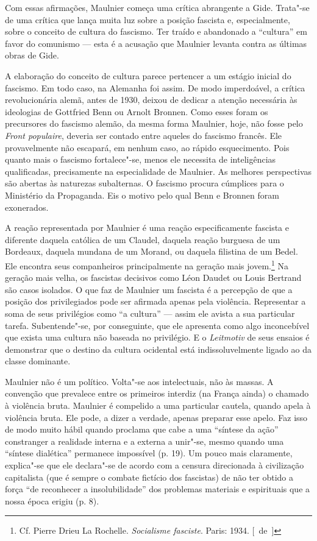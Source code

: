 Com essas afirmações, Maulnier começa uma crítica abrangente a Gide. Trata"-se de
uma crítica que lança muita luz sobre a posição fascista e,
especialmente, sobre o conceito de cultura do fascismo. Ter traído e
abandonado a ``cultura'' em favor do comunismo --- esta é a acusação que
Maulnier levanta contra as últimas obras de Gide.

A elaboração do conceito de cultura parece pertencer a um estágio
inicial do fascismo. Em todo caso, na Alemanha foi assim. De modo
imperdoável, a crítica revolucionária alemã, antes de 1930, deixou de
dedicar a atenção necessária às ideologias de Gottfried Benn ou Arnolt
Bronnen. Como esses foram os precursores do fascismo alemão, da mesma
forma Maulnier, hoje, não fosse pelo \emph{Front populaire}, deveria ser
contado entre aqueles do fascismo francês. Ele provavelmente não
escapará, em nenhum caso, ao rápido esquecimento. Pois quanto mais o
fascismo fortalece"-se, menos ele necessita de inteligências
qualificadas, precisamente na especialidade de Maulnier. As melhores
perspectivas são abertas às naturezas subalternas. O fascismo procura
cúmplices para o Ministério da Propaganda. Eis o motivo pelo qual Benn e Bronnen
foram exonerados.

A reação representada por Maulnier é uma reação especificamente fascista
e diferente daquela católica de um Claudel, daquela reação burguesa de
um Bordeaux, daquela mundana de um Morand, ou daquela filistina de um
Bedel. Ele encontra seus companheiros principalmente na geração mais
jovem.\footnote{Cf. Pierre Drieu La Rochelle. \emph{Socialisme
  fasciste}. Paris: 1934. [~de~]} Na geração mais velha, os fascistas
decisivos como Léon Daudet ou Louis Bertrand são casos isolados. O que
faz de Maulnier um fascista é a percepção de que a posição dos
privilegiados pode ser afirmada apenas pela violência. Representar a soma
de seus privilégios como ``a cultura'' --- assim ele avista a sua
particular tarefa. Subentende"-se, por conseguinte, que ele apresenta
como algo inconcebível que exista uma cultura não baseada no privilégio. E o
\emph{Leitmotiv} de seus ensaios é demonstrar que o destino da cultura
ocidental está indissoluvelmente ligado ao da classe dominante.

Maulnier não é um político. Volta"-se aos intelectuais, não às massas. A
convenção que prevalece entre os primeiros interdiz (na França ainda) o
chamado à violência bruta. Maulnier é compelido a uma particular cautela,
quando apela à violência bruta. Ele pode, a dizer a verdade, apenas
preparar esse apelo. Faz isso de modo muito hábil quando proclama que
cabe a uma ``síntese da ação'' constranger a realidade interna e a
externa a unir"-se, mesmo quando uma ``síntese dialética'' permanece impossível (p.
19). Um pouco mais claramente, explica"-se que ele declara"-se de acordo
com a censura direcionada à civilização capitalista (que é sempre o
combate fictício dos fascistas) de não ter obtido a força ``de reconhecer
a insolubilidade'' dos problemas materiais e espirituais que
a nossa época erigiu (p. 8).


